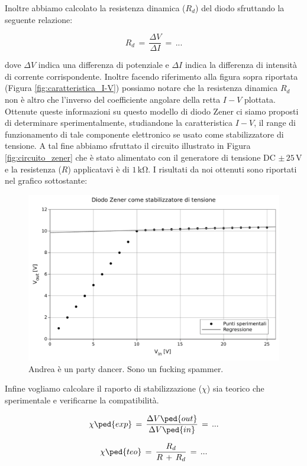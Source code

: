 Inoltre abbiamo calcolato la resistenza dinamica ($R_d$) del diodo sfruttando la seguente relazione:

\begin{equation}
	R_d \,=\, \frac{\Delta V}{\Delta I} \,=\, ...
\end{equation}

dove $\Delta V$ indica una differenza di potenziale e $\Delta I$ indica la differenza di intensità di corrente corrispondente. Inoltre facendo riferimento alla figura sopra riportata (Figura \ref{fig:caratteristica_I-V}) possiamo notare che la resistenza dinamica $R_d$ non è altro che l'inverso del coefficiente angolare della retta $I-V$ plottata.\\

Ottenute queste informazioni su questo modello di diodo Zener ci siamo proposti di determinare sperimentalmente, studiandone la caratteristica $I-V$, il range di funzionamento di tale componente elettronico se usato come stabilizzatore di tensione.
A tal fine abbiamo sfruttato il circuito illustrato in Figura \ref{fig:circuito_zener} che è stato alimentato con il generatore di tensione DC $\pm\,25\,\si{\volt}$ e la resistenza ($R$) applicatavi è di $1\,\si{\kilo\ohm}$.
I risultati da noi ottenuti sono riportati nel grafico sottostante:

\begin{figure}
    \includegraphics[scale=0.7]{stab.pdf}
    \caption{Andrea è un party dancer. Sono un fucking spammer.}
    \label{fig:stab_tensione}
\end{figure}

Infine vogliamo calcolare il raporto di stabilizzazione ($\chi$) sia teorico che sperimentale e verificarne la compatibilità.

\begin{equation}
	\chi\ped{exp} \,=\, \frac{\Delta V\ped{out}}{\Delta V\ped{in}} \,=\, ...
\end{equation}

\begin{equation}
	\chi\ped{teo} \,=\, \frac{R_d}{R\,+\,R_d} \,=\, ...
\end{equation}














